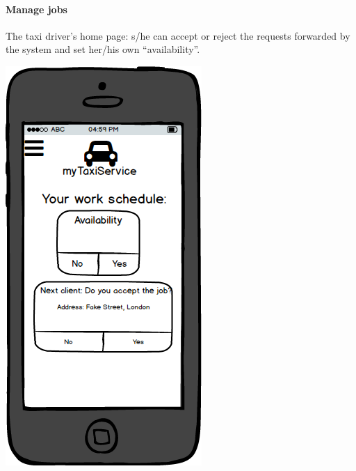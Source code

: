 \documentclass[a4paper,11pt]{report} %
\begin{document}
	\paragraph{Manage jobs} The taxi driver's home page: s/he can accept or reject the requests forwarded by the system and set her/his own ``availability''.
	\begin{center}
		\includegraphics[width=0.5\linewidth]{Pictures/DriverPage}
	\end{center}
	\pagebreak
	
\end{document}
